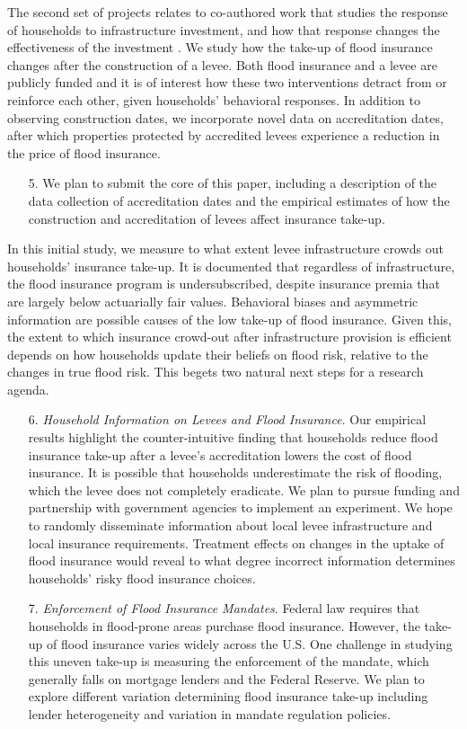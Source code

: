 The second set of projects relates to co-authored work that studies the response of households to infrastructure investment, and how that response changes the effectiveness of the investment \citep{vinnakota_levees_2023}. We study how the take-up of flood insurance changes after the construction of a levee. Both flood insurance and a levee are publicly funded and it is of interest how these two interventions detract from or reinforce each other, given households’ behavioral responses. In addition to observing construction dates, we incorporate novel data on accreditation dates, after which properties protected by accredited levees experience a reduction in the price of flood insurance.

\begin{enumerate}
\item[5.] We plan to submit the core of this paper, including a description of the data collection of accreditation dates and the empirical estimates of how the construction and accreditation of levees affect insurance take-up. 
\end{enumerate}

In this initial study, we measure to what extent levee infrastructure crowds out households’ insurance take-up. It is documented that regardless of infrastructure, the flood insurance program is undersubscribed, despite insurance premia that are largely below actuarially fair values. Behavioral biases and asymmetric information are possible causes of the low take-up of flood insurance. Given this, the extent to which insurance crowd-out after infrastructure provision is efficient depends on how households update their beliefs on flood risk, relative to the changes in true flood risk. This begets two natural next steps for a research agenda.

\begin{enumerate}
\item[6.] \textit{Household Information on Levees and Flood Insurance}. Our empirical results highlight the counter-intuitive finding that households reduce flood insurance take-up after a levee’s accreditation lowers the cost of flood insurance. It is possible that households underestimate the risk of flooding, which the levee does not completely eradicate. We plan to pursue funding and partnership with government agencies to implement an experiment. We hope to randomly disseminate information about local levee infrastructure and local insurance requirements. Treatment effects on changes in the uptake of flood insurance would reveal to what degree incorrect information determines households’ risky flood insurance choices.
\item[7.] \textit{Enforcement of Flood Insurance Mandates}. Federal law requires that households in flood-prone areas purchase flood insurance. However, the take-up of flood insurance varies widely across the U.S. One challenge in studying this uneven take-up is measuring the enforcement of the mandate, which generally falls on mortgage lenders and the Federal Reserve. We plan to explore different variation determining flood insurance take-up including lender heterogeneity and variation in mandate regulation policies.
\end{enumerate}

